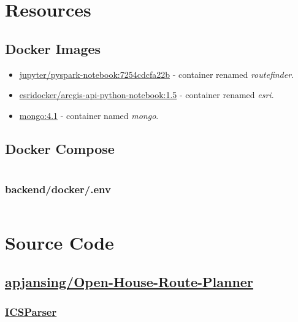 \chapter{Resources}
\section{Docker Images}\label{docker-images}
\begin{itemize}
  \item \href{https://hub.docker.com/r/jupyter/pyspark-notebook}{jupyter/pyspark-notebook:7254cdcfa22b}\cite{img-pyspark} - container renamed \emph{routefinder}.
  \item \href{https://hub.docker.com/r/esridocker/arcgis-api-python-notebook}{esridocker/arcgis-api-python-notebook:1.5}\cite{img-esri} - container renamed \emph{esri}.
  \item \href{https://hub.docker.com/_/mongo}{mongo:4.1}\cite{img-mongo} - container named \emph{mongo}.
\end{itemize}


\section{Docker Compose}

\inputminted{yaml}{../backend/docker/docker-compose.yml}
\subsection{backend/docker/.env}
\inputminted{yaml}{../backend/docker/.env}


\chapter{Source Code}\label{code}
\section{\href{https://github.com/apjansing/Open-House-Route-Planner}{apjansing/Open-House-Route-Planner}}

\subsection{\href{https://github.com/apjansing/Open-House-Route-Planner/blob/master/backend/docker/persistence/pyspark/ICSParser.py}{ICSParser}} \label{ICSParser}

